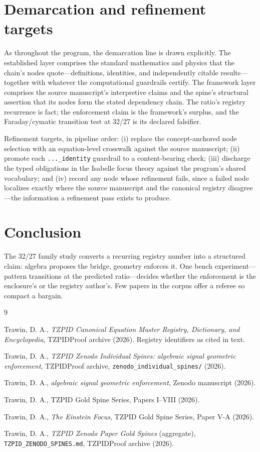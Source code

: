 \documentclass[11pt]{article}
\theoremstyle{remark}
\begin{document}
\section{Demarcation and refinement targets}
\label{sec:demarc}

As throughout the program, the demarcation line is drawn explicitly. The established layer comprises the standard mathematics and physics that the chain's nodes quote---definitions, identities, and independently citable results---together with whatever the computational guardrails certify. The framework layer comprises the source manuscript's interpretive claims and the spine's structural assertion that its nodes form the stated dependency chain. The ratio's registry recurrence is fact; the enforcement claim is the framework's surplus, and the Faraday/cymatic transition test at 32/27 is its declared falsifier.

Refinement targets, in pipeline order: (i) replace the concept-anchored node selection with an equation-level crosswalk against the source manuscript; (ii) promote each \texttt{...\_identity} guardrail to a content-bearing check; (iii) discharge the typed obligations in the Isabelle focus theory against the program's shared vocabulary; and (iv) record any node whose refinement fails, since a failed node localizes exactly where the source manuscript and the canonical registry disagree---the information a refinement pass exists to produce.

\section{Conclusion}
\label{sec:conc}

The 32/27 family study converts a recurring registry number into a structured claim: algebra proposes the bridge, geometry enforces it. One bench experiment---pattern transitions at the predicted ratio---decides whether the enforcement is the enclosure's or the registry author's. Few papers in the corpus offer a referee so compact a bargain.

\begin{thebibliography}{9}

 Trawin, D. A., \emph{TZPID Canonical Equation Master Registry, Dictionary, and Encyclopedia}, TZPIDProof archive (2026). Registry identifiers as cited in text.

 Trawin, D. A., \emph{TZPID Zenodo Individual Spines: algebraic signal geometric enforcement}, TZPIDProof archive, \texttt{zenodo\_individual\_spines/} (2026).

 Trawin, D. A., \emph{algebraic signal geometric enforcement}, Zenodo manuscript (2026).

 Trawin, D. A., TZPID Gold Spine Series, Papers I--VIII (2026).

 Trawin, D. A., \emph{The Einstein Focus}, TZPID Gold Spine Series, Paper V-A (2026).

 Trawin, D. A., \emph{TZPID Zenodo Paper Gold Spines} (aggregate), \texttt{TZPID\_ZENODO\_SPINES.md}, TZPIDProof archive (2026).

\end{thebibliography}
\end{document}
